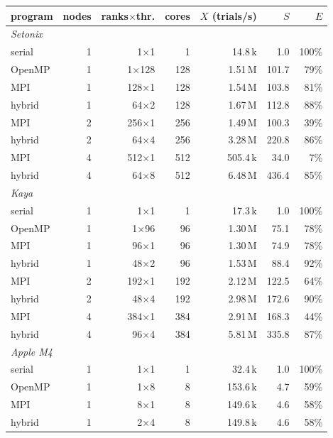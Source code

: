 \begin{tabular}{lrrrrrr}
\toprule
program & nodes & ranks$\times$thr. & cores & $X$ (trials/s) & $S$ & $E$\\
\midrule\multicolumn{7}{l}{\textit{Setonix}}\\
serial & 1 & 1$\times$1 & 1 & 14.8\,k & 1.0 & 100\%\\
OpenMP & 1 & 1$\times$128 & 128 & 1.51\,M & 101.7 & 79\%\\
MPI & 1 & 128$\times$1 & 128 & 1.54\,M & 103.8 & 81\%\\
hybrid & 1 & 64$\times$2 & 128 & 1.67\,M & 112.8 & 88\%\\
MPI & 2 & 256$\times$1 & 256 & 1.49\,M & 100.3 & 39\%\\
hybrid & 2 & 64$\times$4 & 256 & 3.28\,M & 220.8 & 86\%\\
MPI & 4 & 512$\times$1 & 512 & 505.4\,k & 34.0 & 7\%\\
hybrid & 4 & 64$\times$8 & 512 & 6.48\,M & 436.4 & 85\%\\
\midrule\multicolumn{7}{l}{\textit{Kaya}}\\
serial & 1 & 1$\times$1 & 1 & 17.3\,k & 1.0 & 100\%\\
OpenMP & 1 & 1$\times$96 & 96 & 1.30\,M & 75.1 & 78\%\\
MPI & 1 & 96$\times$1 & 96 & 1.30\,M & 74.9 & 78\%\\
hybrid & 1 & 48$\times$2 & 96 & 1.53\,M & 88.4 & 92\%\\
MPI & 2 & 192$\times$1 & 192 & 2.12\,M & 122.5 & 64\%\\
hybrid & 2 & 48$\times$4 & 192 & 2.98\,M & 172.6 & 90\%\\
MPI & 4 & 384$\times$1 & 384 & 2.91\,M & 168.3 & 44\%\\
hybrid & 4 & 96$\times$4 & 384 & 5.81\,M & 335.8 & 87\%\\
\midrule\multicolumn{7}{l}{\textit{Apple M4}}\\
serial & 1 & 1$\times$1 & 1 & 32.4\,k & 1.0 & 100\%\\
OpenMP & 1 & 1$\times$8 & 8 & 153.6\,k & 4.7 & 59\%\\
MPI & 1 & 8$\times$1 & 8 & 149.6\,k & 4.6 & 58\%\\
hybrid & 1 & 2$\times$4 & 8 & 149.8\,k & 4.6 & 58\%\\
\bottomrule
\end{tabular}
